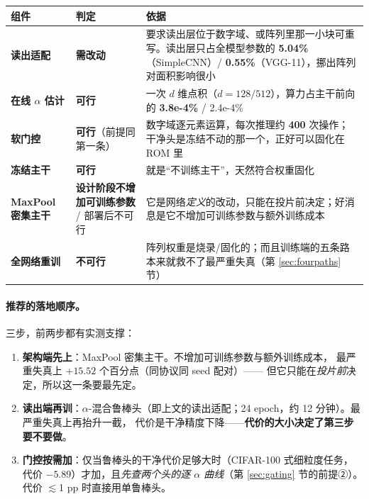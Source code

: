 \documentclass[11pt,a4paper]{ctexart}
\begin{document}
\begin{center}
\small
\begin{tabular}{p{3.0cm}p{2.0cm}p{9.4cm}}
\toprule
组件 & 判定 & 依据 \\
\midrule
\textbf{读出适配} & \textbf{需改动}
& 要求读出层位于数字域、或阵列里那一小块可重写。读出层只占全模型参数的
  \textbf{5.04\%}（SimpleCNN）/ \textbf{0.55\%}（VGG-11），挪出阵列对面积影响很小 \\[2pt]
\textbf{在线 $\alpha$ 估计} & \textbf{可行}
& 一次 $d$ 维点积（$d=128/512$），算力占主干前向的 \textbf{3.8e-4\%} / 2.4e-4\% \\[2pt]
\textbf{软门控} & \textbf{可行}（前提同第一条）
& 数字域逐元素运算，每次推理约 \textbf{400} 次操作；
  干净头是冻结不动的那一个，正好可以固化在 ROM 里 \\[2pt]
\textbf{冻结主干} & \textbf{可行}
& 就是“不训练主干”，天然符合权重固化 \\[2pt]
\textbf{MaxPool 密集主干} & \textbf{设计阶段不增加可训练参数} / 部署后不可行
& 它是网络\emph{定义}的改动，只能在投片前决定；好消息是它不增加可训练参数与额外训练成本 \\[2pt]
\textbf{全网络重训} & \textbf{不可行}
& 阵列权重是烧录/固化的；而且训练端的五条路本来就救不了最严重失真（第 \ref{sec:fourpaths} 节）\\
\bottomrule
\end{tabular}
\end{center}

\paragraph{推荐的落地顺序。}
三步，前两步都有实测支撑：

\begin{enumerate}[leftmargin=2em,itemsep=2pt]
  \item \textbf{架构端先上}：MaxPool 密集主干。不增加可训练参数与额外训练成本，
        最严重失真上 $+15.52$ 个百分点（同协议同 seed 配对）——
        但它只能在\emph{投片前}决定，所以这一条要最先定。
  \item \textbf{读出端再训}：$\alpha$-混合鲁棒头（即上文的读出适配；24 epoch，约 12 分钟）。最严重失真上再抬升一截，
        代价是干净精度下降——\textbf{代价的大小决定了第三步要不要做}。
  \item \textbf{门控按需加}：仅当鲁棒头的干净代价足够大时（CIFAR-100 式细粒度任务，
        代价 $-5.89$）才加，且\emph{先查两个头的逐 $\alpha$ 曲线}（第 \ref{sec:gating} 节的前提②）。
        代价 $\lesssim$1 pp 时直接用单鲁棒头。
\end{enumerate}
\end{document}
